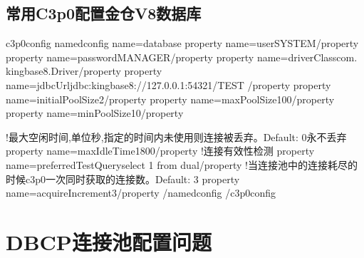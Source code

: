\documentclass[a4,10pt,oneside,english]{sphinxmanual}
\begin{document}
\subsection{常用C3p0配置金仓V8数据库}
\label{\detokenize{interface/c3p0:c3p0v8}}
\begin{sphinxVerbatim}[commandchars=\\\{\}]
\PYGZlt{}c3p0\PYGZhy{}config\PYGZgt{}
       \PYGZlt{}named\PYGZhy{}config name=\PYGZdq{}database\PYGZdq{}\PYGZgt{}
    \PYGZlt{}property name=\PYGZdq{}user\PYGZdq{}\PYGZgt{}SYSTEM\PYGZlt{}/property\PYGZgt{}
    \PYGZlt{}property name=\PYGZdq{}password\PYGZdq{}\PYGZgt{}MANAGER\PYGZlt{}/property\PYGZgt{}
    \PYGZlt{}property name=\PYGZdq{}driverClass\PYGZdq{}\PYGZgt{}com. kingbase8.Driver\PYGZlt{}/property\PYGZgt{}
    \PYGZlt{}property name=\PYGZdq{}jdbcUrl\PYGZdq{}\PYGZgt{}jdbc:kingbase8://127.0.0.1:54321/TEST \PYGZlt{}/property\PYGZgt{}
\PYGZlt{}property name=\PYGZdq{}initialPoolSize\PYGZdq{}\PYGZgt{}2\PYGZlt{}/property\PYGZgt{}
    \PYGZlt{}property name=\PYGZdq{}maxPoolSize\PYGZdq{}\PYGZgt{}100\PYGZlt{}/property\PYGZgt{}
\PYGZlt{}property name=\PYGZdq{}minPoolSize\PYGZdq{}\PYGZgt{}10\PYGZlt{}/property\PYGZgt{}

\PYGZlt{}!\PYGZhy{}\PYGZhy{}最大空闲时间,单位秒,指定的时间内未使用则连接被丢弃。Default: 0永不丢弃\PYGZhy{}\PYGZhy{}\PYGZgt{}
\PYGZlt{}property name=\PYGZdq{}maxIdleTime\PYGZdq{}\PYGZgt{}1800\PYGZlt{}/property\PYGZgt{}
\PYGZlt{}!\PYGZhy{}\PYGZhy{}连接有效性检测\PYGZhy{}\PYGZhy{}\PYGZgt{}
        \PYGZlt{}property name=\PYGZdq{}preferredTestQuery\PYGZdq{}\PYGZgt{}select 1 from dual\PYGZlt{}/property\PYGZgt{}
        \PYGZlt{}!\PYGZhy{}\PYGZhy{}当连接池中的连接耗尽的时候c3p0一次同时获取的连接数。Default: 3 \PYGZhy{}\PYGZhy{}\PYGZgt{}
        \PYGZlt{}property name=\PYGZdq{}acquireIncrement\PYGZdq{}\PYGZgt{}3\PYGZlt{}/property\PYGZgt{}
       \PYGZlt{}/named\PYGZhy{}config\PYGZgt{}
\PYGZlt{}/c3p0\PYGZhy{}config\PYGZgt{}
\end{sphinxVerbatim}


\section{DBCP连接池配置问题}
\label{\detokenize{interface/DBCP:dbcp}}\label{\detokenize{interface/DBCP::doc}}
\end{document}
